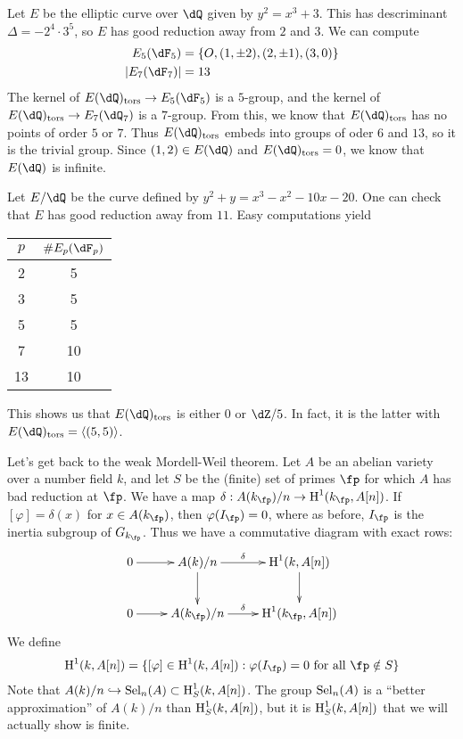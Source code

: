 \documentclass{article}
\begin{document}
\begin{example}
Let $E$ be the elliptic curve over $\dQ$ given by $y^2=x^3+3$. This has 
descriminant $\Delta=-2^4\cdot 3^5$, so $E$ has good reduction away from $2$ 
and $3$. We can compute 
\begin{align*}
  E_5(\dF_5) &= \{O,(1,\pm 2),(2,\pm 1),(3,0)\} \\
  \left|E_7(\dF_7)\right| &= 13
\end{align*}
The kernel of $E(\dQ)_\text{tors}\to E_5(\dF_5)$ is a $5$-group, and the kernel 
of $E(\dQ)_\text{tors}\to E_7(\dQ_7)$ is a $7$-group. From this, we know that 
$E(\dQ)_\text{tors}$ has no points of order $5$ or $7$. Thus  
$E(\dQ)_\text{tors}$ embeds into groups of oder $6$ and $13$, so it is the 
trivial group. Since $(1,2)\in E(\dQ)$ and $E(\dQ)_\text{tors}=0$, we know that 
$E(\dQ)$ is infinite. 
\end{example}

\begin{example}
Let $E/\dQ$ be the curve defined by $y^2 + y = x^3-x^2-10 x-20$. One can check 
that $E$ has good reduction away from $11$. Easy computations yield 
\begin{center}
  \begin{tabular}{c|c}
    $p$ & $  \# E_p(\dF_p)$ \\ \hline
    2   & 5  \\
    3   & 5  \\
    5   & 5  \\
    7   & 10 \\
    13  & 10
  \end{tabular}
\end{center}
This shows us that $E(\dQ)_\text{tors}$ is either $0$ or $\dZ/5$. In fact, it 
is the latter with $E(\dQ)_\text{tors}=\langle (5,5)\rangle$. 
\end{example}

Let's get back to the weak Mordell-Weil theorem. Let $A$ be an abelian variety 
over a number field $k$, and let $S$ be the (finite) set of primes $\fp$ for 
which $A$ has bad reduction at $\fp$. We have a map 
$\delta:A(k_\fp)/n \to\h^1(k_\fp,A[n])$. If $[\varphi]=\delta(x)$ for 
$x\in A(k_\fp)$, then $\varphi(I_\fp) = 0$, where as before, $I_\fp$ is the 
inertia subgroup of $G_{k_\fp}$. Thus we have a commutative diagram with 
exact rows:
\[\xymatrix{
  0 \ar[r] 
    & A(k)/n \ar[r]^-\delta \ar[d]
    & \h^1(k,A[n]) \ar[d] \\
  0 \ar[r]
    & A(k_\fp)/n \ar[r]^-\delta 
    & \h^1(k_\fp,A[n])
}\]
We define 
\[
  \h^1(k,A[n]) = \{[\varphi]\in \h^1(k,A[n]) : \varphi(I_\fp) = 0\text{ for all }\fp\notin S\}
\]
Note that $A(k)/n\hookrightarrow \operatorname{Sel}_n(A)\subset \operatorname{H}_S^1(k,A[n])$. The group 
$\operatorname{Sel}_n(A)$ is a ``better approximation'' of $A(k)/n$ than $\operatorname{H}_S^1(k,A[n])$, 
but it is $\operatorname{H}_S^1(k,A[n])$ that we will actually show is finite. 
\end{document}
